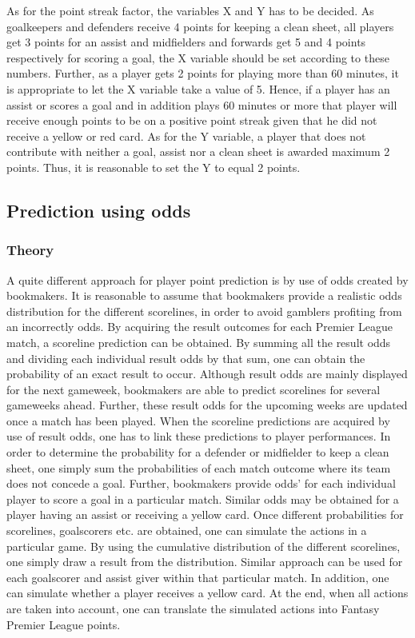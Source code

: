 As for the point streak factor, the variables X and Y has to be decided. As goalkeepers and defenders receive 4 points for keeping a clean sheet, all players get 3 points for an assist and midfielders and forwards get 5 and 4 points respectively for scoring a goal, the X variable should be set according to these numbers. Further, as a player gets 2 points for playing more than 60 minutes, it is appropriate to let the X variable take a value of 5. Hence, if a player has an assist or scores a goal and in addition plays 60 minutes or more that player will receive enough points to be on a positive point streak given that he did not receive a yellow or red card. As for the Y variable, a player that does not contribute with neither a goal, assist nor a clean sheet is awarded maximum 2 points. Thus, it is reasonable to set the Y to equal 2 points. 
\newpar





\subsection{Prediction using odds}
\subsubsection{Theory}
A quite different approach for player point prediction is by use of odds created by bookmakers. It is reasonable to assume that bookmakers provide a realistic odds distribution for the different scorelines, in order to avoid gamblers profiting from an incorrectly odds. By acquiring the result outcomes for each Premier League match, a scoreline prediction can be obtained. By summing all the result odds and dividing each individual result odds by that sum, one can obtain the probability of an exact result to occur. Although result odds are mainly displayed for the next gameweek, bookmakers are able to predict scorelines for several gameweeks ahead. Further, these result odds for the upcoming weeks are updated once a match has been played. 
\newpar
When the scoreline predictions are acquired by use of result odds, one has to link these predictions to player performances. In order to determine the probability for a defender or midfielder to keep a clean sheet, one simply sum the probabilities of each match outcome where its team does not concede a goal. Further, bookmakers provide odds' for each individual player to score a goal in a particular match. Similar odds may be obtained for a player having an assist or receiving a yellow card. 
\newpar
Once different probabilities for scorelines, goalscorers etc. are obtained, one can simulate the actions in a particular game. By using the cumulative distribution of the different scorelines, one simply draw a result from the distribution. Similar approach can be used for each goalscorer and assist giver within that particular match. In addition, one can simulate whether a player receives a yellow card. At the end, when all actions are taken into account, one can translate the simulated actions into Fantasy Premier League points. 

